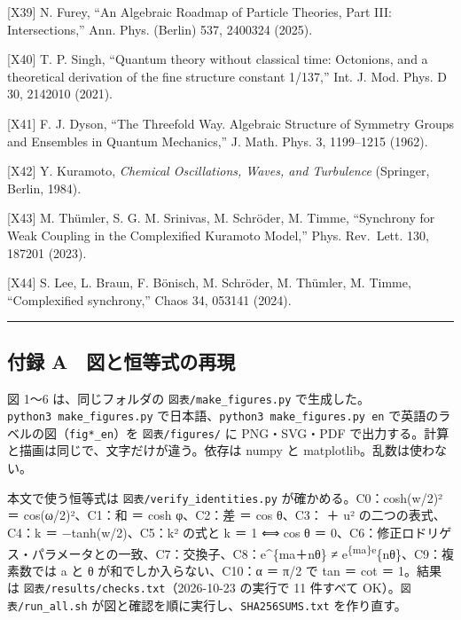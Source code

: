 \documentclass[
  a4paper,
]{ltjsarticle}
\begin{document}
{[}X39{]} N. Furey, ``An Algebraic Roadmap of Particle Theories, Part
III: Intersections,'' Ann. Phys. (Berlin) 537, 2400324 (2025).

{[}X40{]} T. P. Singh, ``Quantum theory without classical time:
Octonions, and a theoretical derivation of the fine structure constant
1/137,'' Int. J. Mod. Phys. D 30, 2142010 (2021).

{[}X41{]} F. J. Dyson, ``The Threefold Way. Algebraic Structure of
Symmetry Groups and Ensembles in Quantum Mechanics,'' J. Math. Phys. 3,
1199--1215 (1962).

{[}X42{]} Y. Kuramoto, \emph{Chemical Oscillations, Waves, and
Turbulence} (Springer, Berlin, 1984).

{[}X43{]} M. Thümler, S. G. M. Srinivas, M. Schröder, M. Timme,
``Synchrony for Weak Coupling in the Complexified Kuramoto Model,''
Phys. Rev.~Lett. 130, 187201 (2023).

{[}X44{]} S. Lee, L. Braun, F. Bönisch, M. Schröder, M. Thümler, M.
Timme, ``Complexified synchrony,'' Chaos 34, 053141 (2024).

\begin{center}\rule{0.5\linewidth}{0.5pt}\end{center}

\subsection{付録
A　図と恒等式の再現}\label{ux4ed8ux9332-a-ux56f3ux3068ux6052ux7b49ux5f0fux306eux518dux73fe}

図 1〜6 は、同じフォルダの \texttt{図表/\allowbreak{}make\_\allowbreak{}figures.py}
で生成した。\texttt{python3\ make\_\allowbreak{}figures.py}
で日本語、\texttt{python3\ make\_\allowbreak{}figures.py\ en}
で英語のラベルの図（\texttt{fig*\_\allowbreak{}en}）を \texttt{図表/\allowbreak{}figures/\allowbreak{}} に
PNG・SVG・PDF で出力する。計算と描画は同じで、文字だけが違う。依存は
numpy と matplotlib。乱数は使わない。

本文で使う恒等式は \texttt{図表/\allowbreak{}verify\_\allowbreak{}identities.py}
が確かめる。C0：\textbar cosh(w/2)\textbar² ＝
\textbar cos(ω/2)\textbar²、C1：和 ＝ cosh φ、C2：差 ＝ cos
θ、C3： ＋ u\textbar² の二つの表式、C4：k ＝
−tanh(w/2)、C5：\textbar k\textbar² の式と \textbar k\textbar{} ＝ 1 ⟺
cos θ ＝
0、C6：修正ロドリゲス・パラメータとの一致、C7：交換子、C8：e\^{}\{ma＋nθ\}
≠ e\textsuperscript{\{ma\}e}\{nθ\}、C9：複素数では a と θ
が和でしか入らない、C10：α ＝ π/2 で tan ＝ cot ＝ 1。結果は
\texttt{図表/\allowbreak{}results/\allowbreak{}checks.txt}（2026-10-23 の実行で 11 件すべて
OK）。\texttt{図表/\allowbreak{}run\_\allowbreak{}all.sh}
が図と確認を順に実行し、\texttt{SHA256SUMS.txt} を作り直す。
\end{document}
